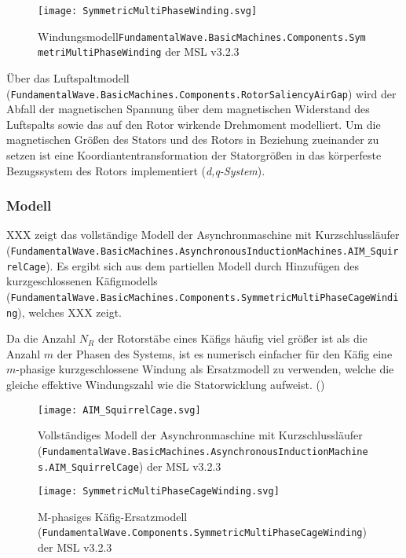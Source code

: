 \begin{figure}
\centering
\texttt{[image: SymmetricMultiPhaseWinding.svg]}
\caption{Windungsmodell\texttt{FundamentalWave.BasicMachines.Components.SymmetriMultiPhaseWinding}
der MSL v3.2.3}
\end{figure}

Über das Luftspaltmodell
(\texttt{FundamentalWave.BasicMachines.Components.RotorSaliencyAirGap})
wird der Abfall der magnetischen Spannung über dem magnetischen
Widerstand des Luftspalts sowie das auf den Rotor wirkende Drehmoment
modelliert. Um die magnetischen Größen des Stators und des Rotors in
Beziehung zueinander zu setzen ist eine Koordiantentransformation der
Statorgrößen in das körperfeste Bezugssystem des Rotors implementiert
(\emph{d,q-System}).

\hypertarget{modell}{%
\subsubsection{Modell}\label{modell}}

XXX zeigt das vollständige Modell der Asynchronmaschine mit
Kurzschlussläufer
(\texttt{FundamentalWave.BasicMachines.AsynchronousInductionMachines.AIM\_SquirrelCage}).
Es ergibt sich aus dem partiellen Modell durch Hinzufügen des
kurzgeschlossenen Käfigmodells
(\texttt{FundamentalWave.BasicMachines.Components.SymmetricMultiPhaseCageWinding}),
welches XXX zeigt.

Da die Anzahl \(N_R\) der Rotorstäbe eines Käfigs häufig viel größer ist
als die Anzahl \(m\) der Phasen des Systems, ist es numerisch einfacher
für den Käfig eine \(m\)-phasige kurzgeschlossene Windung als
Ersatzmodell zu verwenden, welche die gleiche effektive Windungszahl wie
die Statorwicklung aufweist.
(\cite[S. 194]{kralModelicaObjektorientierteModellbildung2019})

\begin{figure}
\centering
\texttt{[image: AIM\_SquirrelCage.svg]}
\caption{Vollständiges Modell der Asynchronmaschine mit
Kurzschlussläufer
(\texttt{FundamentalWave.BasicMachines.AsynchronousInductionMachines.AIM\_SquirrelCage})
der MSL v3.2.3}
\end{figure}

\begin{figure}
\centering
\texttt{[image: SymmetricMultiPhaseCageWinding.svg]}
\caption{M-phasiges Käfig-Ersatzmodell
(\texttt{FundamentalWave.Components.SymmetricMultiPhaseCageWinding}) der
MSL v3.2.3}
\end{figure}

